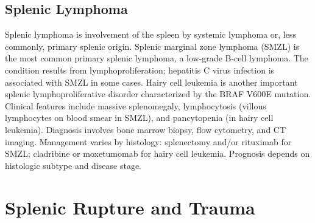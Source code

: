 \subsection{Splenic Lymphoma}
\label{sec:Splenic Lymphoma}
Splenic lymphoma is involvement of the spleen by systemic lymphoma or, less commonly, primary splenic origin. Splenic marginal zone lymphoma (SMZL) is the most common primary splenic lymphoma, a low-grade B-cell lymphoma. The condition results from lymphoproliferation; hepatitis C virus infection is associated with SMZL in some cases. Hairy cell leukemia is another important splenic lymphoproliferative disorder characterized by the BRAF V600E mutation. Clinical features include massive splenomegaly, lymphocytosis (villous lymphocytes on blood smear in SMZL), and pancytopenia (in hairy cell leukemia). Diagnosis involves bone marrow biopsy, flow cytometry, and CT imaging. Management varies by histology: splenectomy and/or rituximab for SMZL; cladribine or moxetumomab for hairy cell leukemia. Prognosis depends on histologic subtype and disease stage.

\section{Splenic Rupture and Trauma}








\label{sec:Splenic Rupture and Trauma}

